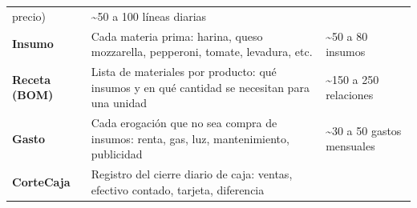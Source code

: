 \documentclass[
  12pt,
  spanish,
]{article}
\begin{document}
\begin{longtable}[]{@{}lll@{}}
\begin{minipage}[t]{0.30\columnwidth}
precio)\strut
\end{minipage} & \begin{minipage}[t]{0.30\columnwidth}\raggedright
\textasciitilde50 a 100 líneas diarias\strut
\end{minipage}\tabularnewline
\begin{minipage}[t]{0.30\columnwidth}\raggedright
\textbf{Insumo}\strut
\end{minipage} & \begin{minipage}[t]{0.30\columnwidth}\raggedright
Cada materia prima: harina, queso mozzarella, pepperoni, tomate,
levadura, etc.\strut
\end{minipage} & \begin{minipage}[t]{0.30\columnwidth}\raggedright
\textasciitilde50 a 80 insumos\strut
\end{minipage}\tabularnewline
\begin{minipage}[t]{0.30\columnwidth}\raggedright
\textbf{Receta (BOM)}\strut
\end{minipage} & \begin{minipage}[t]{0.30\columnwidth}\raggedright
Lista de materiales por producto: qué insumos y en qué cantidad se
necesitan para una unidad\strut
\end{minipage} & \begin{minipage}[t]{0.30\columnwidth}\raggedright
\textasciitilde150 a 250 relaciones\strut
\end{minipage}\tabularnewline
\begin{minipage}[t]{0.30\columnwidth}\raggedright
\textbf{Gasto}\strut
\end{minipage} & \begin{minipage}[t]{0.30\columnwidth}\raggedright
Cada erogación que no sea compra de insumos: renta, gas, luz,
mantenimiento, publicidad\strut
\end{minipage} & \begin{minipage}[t]{0.30\columnwidth}\raggedright
\textasciitilde30 a 50 gastos mensuales\strut
\end{minipage}\tabularnewline
\begin{minipage}[t]{0.30\columnwidth}\raggedright
\textbf{CorteCaja}\strut
\end{minipage} & \begin{minipage}[t]{0.30\columnwidth}\raggedright
Registro del cierre diario de caja: ventas, efectivo contado, tarjeta,
diferencia\strut
\end{minipage} & \begin{minipage}[t]{0.30\columnwidth}\raggedright

\end{minipage}
\end{longtable}
\end{document}
